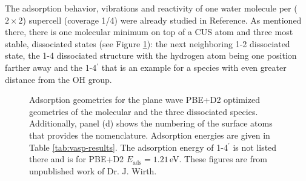 \documentclass[11pt,DIV=13,BCOR=5mm,a4paper,headinclude]{scrbook}
\begin{document}
The adsorption behavior, vibrations and reactivity of one water  molecule per ($2\times 2$) supercell (coverage 1/4) were already studied in Reference\cite{WirthJPCC2012}.
As mentioned there, there is one molecular minimum on top of a CUS atom and three most stable, dissociated states (see Figure \ref{abb:0001_ads}): the next neighboring 1-2 dissociated state, the 1-4 dissociated structure with the hydrogen atom being one position farther away and the 1-4$^\prime$ that is an example for a species with even greater distance from the OH group.
\begin{figure} [!ht]
\centering
{}
         \quad
{}
 \quad
{}
 \quad
{}
\caption{Adsorption geometries for the plane wave PBE+D2 optimized geometries of the molecular and the three dissociated species.
Additionally, panel (d) shows the numbering of the surface atoms that provides the nomenclature.
Adsorption energies are given in Table \ref{tab:vasp-results}.
The adsorption energy of 1-4$^\prime$ is not listed there and is for PBE+D2 $E_\textrm{ads}=1.21\,$eV.
These figures are from unpublished work of Dr. J. Wirth.}
       \label{abb:0001_ads}
\end{figure}
\end{document}
